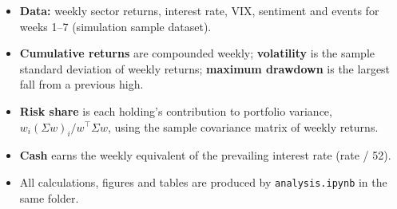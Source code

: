 \documentclass[11pt]{article}
\begin{document}
{\small
\begin{itemize}[leftmargin=1.5em, itemsep=1pt]
  \item \textbf{Data:} weekly sector returns, interest rate, VIX, sentiment
  and events for weeks 1--7 (simulation sample dataset).
  \item \textbf{Cumulative returns} are compounded weekly; \textbf{volatility}
  is the sample standard deviation of weekly returns; \textbf{maximum
  drawdown} is the largest fall from a previous high.
  \item \textbf{Risk share} is each holding's contribution to portfolio
  variance, $w_i(\Sigma w)_i / w^\top\Sigma w$, using the sample covariance
  matrix of weekly returns.
  \item \textbf{Cash} earns the weekly equivalent of the prevailing interest
  rate (rate / 52).
  \item All calculations, figures and tables are produced by
  \texttt{analysis.ipynb} in the same folder.
\end{itemize}}
\end{document}
